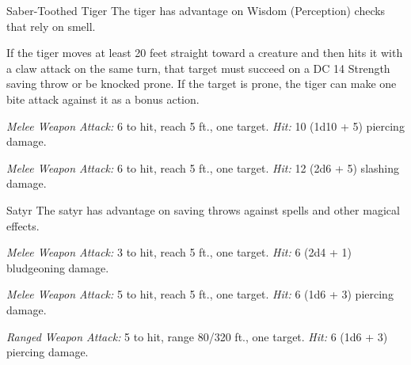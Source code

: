 \documentclass[10pt,a4paper,twoside,bg=print,twocolumn,openany,nodeprecatedcode]{dndbook}
\begin{document}
\begin{DndMonster}[float=t]{Saber-Toothed Tiger}
\DndMonsterBasics[
armor-class = {12},
hit-points = {\DndDice{7d10 + 14}},
speed = {40 ft.}
]
\DndMonsterAbilityScores[
 str = 18,
 dex = 14,
 con = 15,
 int = 3,
 wis = 12,
 cha = 8
]
\DndMonsterDetails[
skills = {Perception +3, Stealth +6},
challenge = 2,
]
The tiger has advantage on Wisdom (Perception) checks that rely on smell.

If the tiger moves at least 20 feet straight toward a creature and then hits it with a claw attack on the same turn, that target must succeed on a DC 14 Strength saving throw or be knocked prone. If the target is prone, the tiger can make one bite attack against it as a bonus action.

\textsl{Melee Weapon Attack:} 6 to hit, reach 5 ft., one target. \textsl{Hit:} 10 (1d10 + 5) piercing damage.

\textsl{Melee Weapon Attack:} 6 to hit, reach 5 ft., one target. \textsl{Hit:} 12 (2d6 + 5) slashing damage.

\end{DndMonster}



\begin{DndMonster}[float=t]{Satyr}
\DndMonsterBasics[
armor-class = {14 (\textit{leather armor})},
hit-points = {\DndDice{7d8}},
speed = {40 ft.}
]
\DndMonsterAbilityScores[
 str = 12,
 dex = 16,
 con = 11,
 int = 12,
 wis = 10,
 cha = 14
]
\DndMonsterDetails[
skills = {Perception +2, Performance +6, Stealth +5},
languages = {Common, Elvish, Sylvan},
challenge = 1/2,
]
The satyr has advantage on saving throws against spells and other magical effects.

\textsl{Melee Weapon Attack:} 3 to hit, reach 5 ft., one target. \textsl{Hit:} 6 (2d4 + 1) bludgeoning damage.

\textsl{Melee Weapon Attack:} 5 to hit, reach 5 ft., one target. \textsl{Hit:} 6 (1d6 + 3) piercing damage.

\textsl{Ranged Weapon Attack:} 5 to hit, range 80/320 ft., one target. \textsl{Hit:} 6 (1d6 + 3) piercing damage.

\end{DndMonster}
\end{document}

